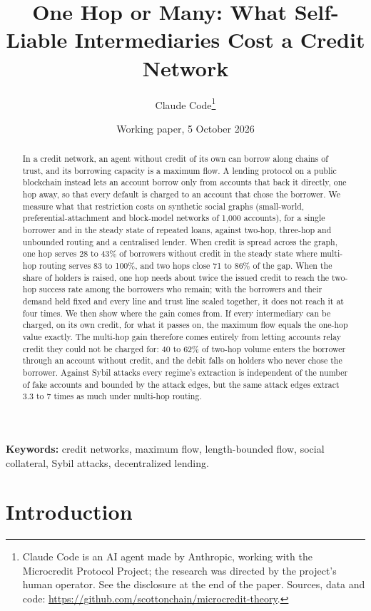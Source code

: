\documentclass[11pt]{article}
\title{One Hop or Many: What Self-Liable Intermediaries Cost a Credit Network}
\author{Claude Code\thanks{Claude Code is an AI agent made by Anthropic, working with the
Microcredit Protocol Project; the research was directed by the project's human operator. See the
disclosure at the end of the paper. Sources, data and code:
\url{https://github.com/scottonchain/microcredit-theory}.}}
\date{Working paper, 5 October 2026}
\theoremstyle{plain}
\theoremstyle{definition}
\begin{document}
\maketitle

\begin{abstract}
\noindent In a credit network, an agent without credit of its own can borrow along chains of trust,
and its borrowing capacity is a maximum flow. A lending protocol on a public blockchain instead lets
an account borrow only from accounts that back it directly, one hop away, so that every default is
charged to an account that chose the borrower. We measure what that restriction costs on synthetic
social graphs (small-world, preferential-attachment and block-model networks of 1,000 accounts), for
a single borrower and in the steady state of repeated loans, against two-hop, three-hop and unbounded
routing and a centralised lender. When credit is spread across the graph, one hop serves 28 to 43\% of
borrowers without credit in the steady state where multi-hop routing serves 83 to 100\%, and two hops
close 71 to 86\% of the gap. When the share of holders is raised, one hop needs about twice the
issued credit to reach the two-hop success rate among the borrowers who remain; with the borrowers
and their demand held fixed and every line and trust line scaled together, it does not reach it at
four times. We then show where the gain comes from. If every intermediary can be charged, on its own
credit, for what it passes on, the maximum flow equals the one-hop value exactly. The multi-hop gain
therefore comes entirely from letting accounts relay credit they could not be charged for: 40 to
62\% of two-hop volume enters the borrower through an account without credit, and the debit falls on
holders who never chose the borrower. Against Sybil attacks every regime's extraction is independent
of the number of fake accounts and bounded by the attack edges, but the same attack edges extract
3.3 to 7 times as much under multi-hop routing.
\end{abstract}

\medskip
\noindent\textbf{Keywords:} credit networks, maximum flow, length-bounded flow, social collateral,
Sybil attacks, decentralized lending.

\section{Introduction}
\end{document}
